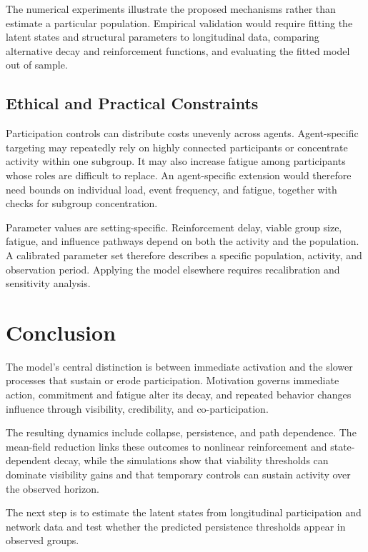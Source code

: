 \documentclass[11pt]{article}
\begin{document}
The numerical experiments illustrate the proposed mechanisms rather than estimate a particular population. Empirical validation would require fitting the latent states and structural parameters to longitudinal data, comparing alternative decay and reinforcement functions, and evaluating the fitted model out of sample. 

\subsection{Ethical and Practical Constraints}

Participation controls can distribute costs unevenly across agents. Agent-specific targeting may repeatedly rely on highly connected participants or concentrate activity within one subgroup. It may also increase fatigue among participants whose roles are difficult to replace. An agent-specific extension would therefore need bounds on individual load, event frequency, and fatigue, together with checks for subgroup concentration. 

Parameter values are setting-specific. Reinforcement delay, viable group size, fatigue, and influence pathways depend on both the activity and the population. A calibrated parameter set therefore describes a specific population, activity, and observation period. Applying the model elsewhere requires recalibration and sensitivity analysis. 

\section{Conclusion}

The model’s central distinction is between immediate activation and the slower processes that sustain or erode participation. Motivation governs immediate action, commitment and fatigue alter its decay, and repeated behavior changes influence through visibility, credibility, and co-participation. 

The resulting dynamics include collapse, persistence, and path dependence. The mean-field reduction links these outcomes to nonlinear reinforcement and state-dependent decay, while the simulations show that viability thresholds can dominate visibility gains and that temporary controls can sustain activity over the observed horizon. 

The next step is to estimate the latent states from longitudinal participation and network data and test whether the predicted persistence thresholds appear in observed groups. 
\end{document}
